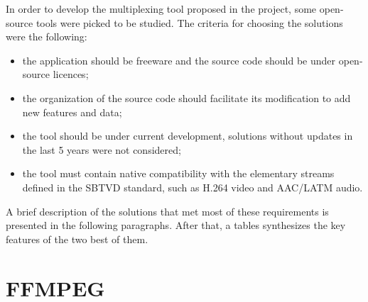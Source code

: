\documentclass[
	12pt,				%
	openright,			%
	twoside,			%
	a4paper,			%
	brazil,
	french,				%
	english
	]{abntex2}
\begin{document}
In order to develop the multiplexing tool proposed in the project, some open-source tools were picked to be studied. The criteria for choosing the solutions were the following:
\begin{itemize}
\item{the application should be freeware and the source code should be under open-source licences;}
\item{the organization of the source code should facilitate its modification to add new features and data;}
\item{the tool should be under current development, solutions without updates in the last 5 years were not considered;}
\item{the tool must contain native compatibility with the elementary streams defined in the SBTVD standard, such as H.264 video and AAC/LATM audio.}
\end{itemize}

A brief description of the solutions that met most of these requirements is presented in the following paragraphs. After that, a tables synthesizes the key features of the two best of them.





\section{FFMPEG}
\end{document}
